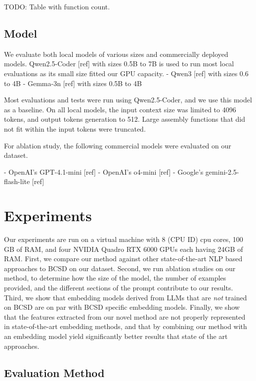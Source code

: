 \documentclass[conference,compsoc]{IEEEtran}
\begin{document}
TODO: Table with function count.

\subsection{Model}

We evaluate both local models of various sizes and commercially deployed models. Qwen2.5-Coder [ref] with sizes 0.5B to 7B
is used to run most local evaluations as its small size fitted our GPU capacity.
- Qwen3 [ref] with sizes 0.6 to 4B
- Gemma-3n [ref] with sizes 0.5B to 4B

Most evaluations and tests were run using Qwen2.5-Coder, and we use this model as a baseline.
On all local models, the input context size was limited to 4096 tokens, and output tokens generation to 512.
Large assembly functions that did not fit within the input tokens were truncated.

For ablation study, the following commercial models were evaluated on our dataset.

- OpenAI's GPT-4.1-mini [ref]
- OpenAI's o4-mini [ref]
- Google's gemini-2.5-flash-lite [ref]

\section{Experiments}

Our experiments are run on a virtual machine with 8 (CPU ID) cpu cores, 100 GB of RAM, and four NVIDIA Quadro RTX
6000 GPUs each having  24GB of RAM. First, we compare our method against other state-of-the-art NLP based
approaches to BCSD on our dataset. Second, we run ablation studies on our method, to determine how the size
of the model, the number of examples provided, and the different sections of the prompt contribute to our results.
Third, we show that embedding models derived from LLMs that are \textit{not} trained on BCSD are on par with BCSD specific
embedding models. Finally, we show that the features extracted from our novel method are not properly represented
in state-of-the-art embedding methods, and that by combining our method with an embedding model yield significantly
better results that state of the art approaches.

\subsection{Evaluation Method}
\end{document}
